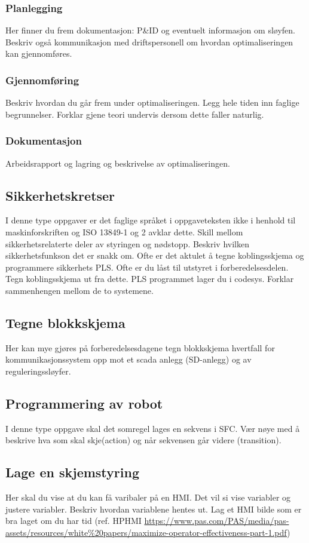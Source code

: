 \subsubsection*{Planlegging}
Her finner du frem dokumentasjon: P\&ID og eventuelt informasjon om sløyfen. Beskriv også kommunikasjon med driftspersonell om hvordan optimaliseringen kan gjennomføres. 
\subsubsection*{Gjennomføring}
Beskriv hvordan du går frem under optimaliseringen. Legg hele tiden inn faglige begrunnelser. Forklar gjene teori undervis dersom dette faller naturlig. 
\subsubsection*{Dokumentasjon}
Arbeidsrapport og lagring og beskrivelse av optimaliseringen. 
\subsection{Sikkerhetskretser}
I denne type oppgaver er det faglige språket i oppgaveteksten ikke i henhold til maskinforskriften og ISO 13849-1 og 2 avklar dette. Skill mellom sikkerhetsrelaterte deler av styringen og nødstopp. Beskriv hvilken sikkerhetsfunkson det er snakk om. 
\vskip 5pt 
Ofte er det aktulet å tegne koblingsskjema og programmere sikkerhets PLS. Ofte er du låst til utstyret i forberedelsesdelen. Tegn koblingsskjema ut fra dette. PLS programmet lager du i codesys. Forklar sammenhengen mellom de to systemene. 
\subsection{Tegne blokkskjema}
Her kan mye gjøres på forberedelsesdagene tegn blokkskjema hvertfall for kommunikasjonssystem opp mot et scada anlegg (SD-anlegg) og av reguleringssløyfer. 
\subsection{Programmering av robot}
I denne type oppgave skal det somregel lages en sekvens i SFC. Vær nøye med å beskrive hva som skal skje(action) og når sekvensen går videre (transition). 
\subsection{Lage en skjemstyring}
Her skal du vise at du kan få varibaler på en HMI. Det vil si vise variabler og justere variabler. Beskriv hvordan variablene hentes ut. 
\vskip 5pt 
Lag et HMI bilde som er bra laget om du har tid (ref. HPHMI \url{https://www.pas.com/PAS/media/pas-assets/resources/white%20papers/maximize-operator-effectiveness-part-1.pdf})
